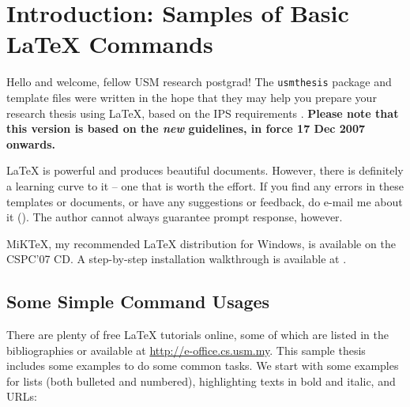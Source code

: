 \chapter{Introduction: Samples of Basic \LaTeX{} Commands}\label{chap:intro}

Hello and welcome, fellow \ac{USM} research postgrad!  The \verb|usmthesis| package and template files were written in the hope that they may help you prepare your research thesis using \LaTeX, based on the \ac{IPS} requirements \citep{ips:thesis:guideline:2007}. \textbf{Please note that this version is based on the \emph{new} guidelines, in force 17 Dec 2007 onwards.}

\LaTeX{} is powerful and produces beautiful documents.  However, there is definitely a learning curve to it -- one that is worth the effort.  %
If you find any errors in these templates or documents, or have any suggestions or feedback, do e-mail me about it ().  The author cannot always guarantee prompt response, however. \Smiley

MiK\TeX{}, my recommended \LaTeX{} distribution for Windows, is available on the CSPC'07 CD. A step-by-step installation walkthrough is available at \citep{lim:latextypesetting}.

\section{Some Simple Command Usages}

There are plenty of free \LaTeX{} tutorials online, some of which are listed in the bibliographies or available at \url{http://e-office.cs.usm.my}.  This sample thesis includes some examples to do some common tasks.  We start with some examples for lists (both bulleted and numbered), highlighting texts in bold and italic, and URLs:


